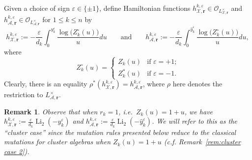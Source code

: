 \documentclass{amsart}
\newtheorem{remark}[theorem]{Remark}
\numberwithin{equation}{section}
\newcommand{\bfr}{{\boldsymbol{r}}}
\newcommand{\cA}{\mathcal{A}}
\newcommand{\cO}{\mathcal{O}}
\newcommand{\cX}{\mathcal{X}}
\newcommand{\Li}{\operatorname{Li}}
\begin{document}
Given a choice of sign $\varepsilon\in\{\pm1\}$, define Hamiltonian functions $h^{k,\varepsilon}_{\cX,\bfr}\in\cO_{L^\times_{\cX,\bfr}}$ and $h^{k,\varepsilon}_{\cA,\bfr}\in\cO_{L^\times_{\cA,\bfr}}$ for $1\le k\le n$ by
\begin{equation}
  \label{eq:hamiltonians}
  h_{\cX,\bfr}^{k,\varepsilon}:=-\frac{\varepsilon}{d_k}\int_0^{y_k^\varepsilon} \frac{\log\big(Z_k^\circ(u)\big)}{u}du\qquad\text{and}\qquad h_{\cA,\bfr}^{k,\varepsilon}:=-\frac{\varepsilon}{d_k}\int_0^{\hat y_k^\varepsilon} \frac{\log\big(Z_k^\circ(u)\big)}{u}du,
\end{equation}
where
\[ Z_k^\circ(u)=\begin{cases} Z_k(u) & \text{if $\varepsilon=+1$;}\\ Z_k^*(u) & \text{if $\varepsilon=-1$.} \end{cases}\]
Clearly, there is an equality $\rho^*(h_{\cX,\bfr}^{k,\varepsilon})=h_{\cA,\bfr}^{k,\varepsilon}$, where $\rho$ here denotes the restriction to $L^\times_{\cA,\bfr}$.
\begin{remark}
  \label{rem:cluster case}
  Observe that when $r_k=1$, i.e.\ $Z_k(u)=1+u$, we have $h_{\cX,\bfr}^{k,\varepsilon}:=\frac{\varepsilon}{d_k}\Li_2(-y_k^\varepsilon)$ and $h_{\cA,\bfr}^{k,\varepsilon}:=\frac{\varepsilon}{d_k}\Li_2(-\hat y_k^\varepsilon)$.
  We will refer to this as the ``cluster case'' since the mutation rules presented below reduce to the classical mutations for cluster algebras when $Z_k(u)=1+u$ (c.f. Remark~\ref{rem:cluster case 2}).
\end{remark}
\end{document}
